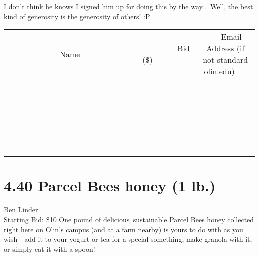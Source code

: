 \documentclass[11pt]{article}
\begin{document}
I don't think he knows I signed him up for doing this by the way... Well, the best kind of generosity is the generosity of others! :P
\\[6ex]
\begin{tabular}{c c c}
~~~~~~~~~~~~~Name~~~~~~~~~~~~~ & ~~~~~~~~~Bid (\$)~~~~~~~~~  & ~~~Email Address (if not standard olin.edu)~~~\\
 & & \\
\hline
 & & \\
\hline
 & & \\
\hline
 & & \\
\hline
 & & \\
\hline
 & & \\
\hline
 & & \\
\hline
 & & \\
\hline
 & & \\
\hline
 & & \\
\hline
 & & \\
\hline
 & & \\
\hline
 & & \\
\hline
 & & \\
\hline
 & & \\
\hline
 & & \\
\hline
 & & \\
\hline
 & & \\
\hline
 & & \\
\hline
 & & \\
\hline
 & & \\
\hline
 & & \\
\hline
 & & \\
\hline
 & & \\
\hline
 & & \\
\hline
 & & \\
\hline
\end{tabular}
\newpage
\section*{4.40 Parcel Bees honey (1 lb.)}
Ben Linder
\\
Starting Bid: \$10
\newline
One pound of delicious, sustainable Parcel Bees honey collected right here on Olin's campus (and at a farm nearby) is yours to do with as you wish - add it to your yogurt or tea for a special something, make granola with it, or simply eat it with a spoon! 
\end{document}

